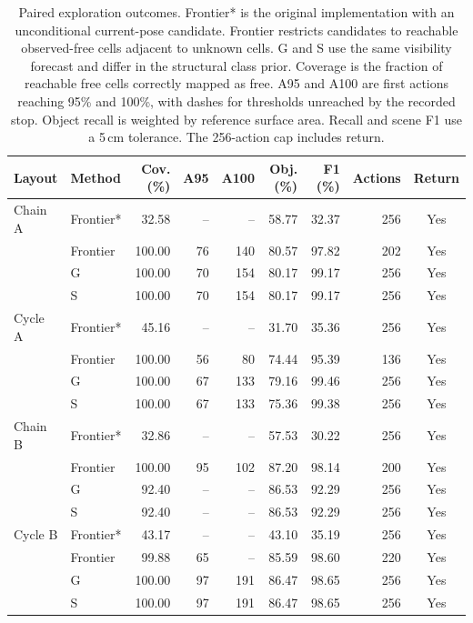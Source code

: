\begin{table}[tb]
\centering
\small
\caption{Paired exploration outcomes. Frontier* is the original implementation with an unconditional current-pose candidate. Frontier restricts candidates to reachable observed-free cells adjacent to unknown cells. G and S use the same visibility forecast and differ in the structural class prior. Coverage is the fraction of reachable free cells correctly mapped as free. A95 and A100 are first actions reaching 95\% and 100\%, with dashes for thresholds unreached by the recorded stop. Object recall is weighted by reference surface area. Recall and scene F1 use a 5\,cm tolerance. The 256-action cap includes return.}
\label{tab:matched-frontier-prior}
\begin{tabular}{llrrrrrrc}
\toprule
Layout & Method & Cov. (\%) & A95 & A100 & Obj. (\%) & F1 (\%) & Actions & Return \\
\midrule
Chain A & Frontier* & 32.58 & -- & -- & 58.77 & 32.37 & 256 & Yes \\
 & Frontier & 100.00 & 76 & 140 & 80.57 & 97.82 & 202 & Yes \\
 & G & 100.00 & 70 & 154 & 80.17 & 99.17 & 256 & Yes \\
 & S & 100.00 & 70 & 154 & 80.17 & 99.17 & 256 & Yes \\
\addlinespace
Cycle A & Frontier* & 45.16 & -- & -- & 31.70 & 35.36 & 256 & Yes \\
 & Frontier & 100.00 & 56 & 80 & 74.44 & 95.39 & 136 & Yes \\
 & G & 100.00 & 67 & 133 & 79.16 & 99.46 & 256 & Yes \\
 & S & 100.00 & 67 & 133 & 75.36 & 99.38 & 256 & Yes \\
\addlinespace
Chain B & Frontier* & 32.86 & -- & -- & 57.53 & 30.22 & 256 & Yes \\
 & Frontier & 100.00 & 95 & 102 & 87.20 & 98.14 & 200 & Yes \\
 & G & 92.40 & -- & -- & 86.53 & 92.29 & 256 & Yes \\
 & S & 92.40 & -- & -- & 86.53 & 92.29 & 256 & Yes \\
\addlinespace
Cycle B & Frontier* & 43.17 & -- & -- & 43.10 & 35.19 & 256 & Yes \\
 & Frontier & 99.88 & 65 & -- & 85.59 & 98.60 & 220 & Yes \\
 & G & 100.00 & 97 & 191 & 86.47 & 98.65 & 256 & Yes \\
 & S & 100.00 & 97 & 191 & 86.47 & 98.65 & 256 & Yes \\
\bottomrule
\end{tabular}
\end{table}
